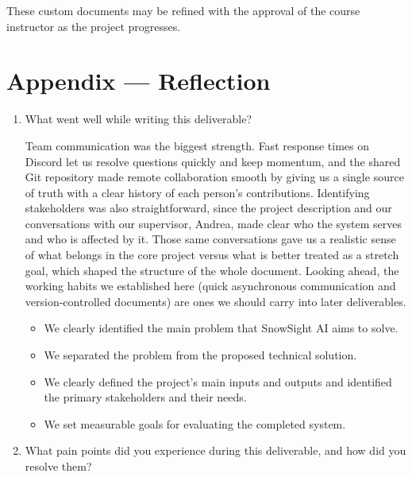 \documentclass{article}
\begin{document}
These custom documents may be refined with the approval of the course
instructor as the project progresses.

\newpage{}

\section*{Appendix --- Reflection}



\begin{enumerate}

    \item What went well while writing this deliverable?
    
    Team communication was the biggest strength. Fast response times on Discord let us resolve questions quickly and keep momentum, and the shared Git repository made remote collaboration smooth by giving us a single source of truth with a clear history of each person's contributions. Identifying stakeholders was also straightforward, since the project description and our conversations with our supervisor, Andrea, made clear who the system serves and who is affected by it. Those same conversations gave us a realistic sense of what belongs in the core project versus what is better treated as a stretch goal, which shaped the structure of the whole document. Looking ahead, the working habits we established here (quick asynchronous communication and version-controlled documents) are ones we should carry into later deliverables.

    \begin{itemize}
        \item We clearly identified the main problem that SnowSight AI aims to solve.
        \item We separated the problem from the proposed technical solution.
        \item We clearly defined the project's main inputs and outputs and identified the primary stakeholders and their needs.
        \item We set measurable goals for evaluating the completed system.
    \end{itemize}

    \item What pain points did you experience during this deliverable, and how
    did you resolve them?
    

\end{enumerate}
\end{document}
